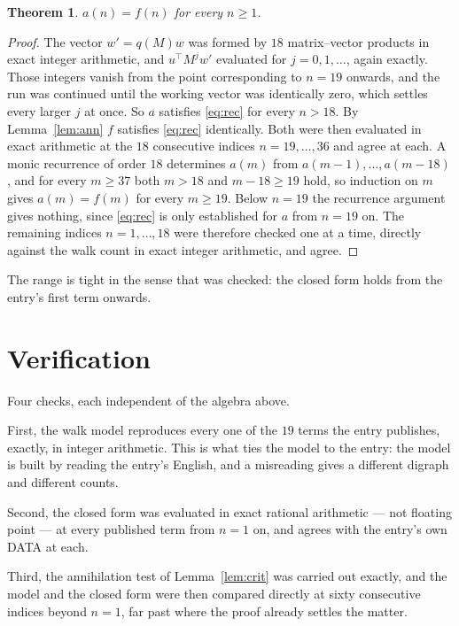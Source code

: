 \documentclass[11pt,a4paper]{article}
\theoremstyle{plain}
\newtheorem{theorem}{Theorem}
\theoremstyle{definition}
\begin{document}
\begin{theorem}
$a(n)=f(n)$ for every $n\ge1$.
\end{theorem}

\begin{proof}
The vector $w'=q(M)w$ was formed by $18$ matrix--vector products in exact integer
arithmetic, and $u^{\!\top}M^{j}w'$ evaluated for $j=0,1,\dots$, again exactly. Those integers
vanish from the point corresponding to $n=19$ onwards, and the run was continued until the
working vector was identically zero, which settles every larger $j$ at once. So $a$ satisfies
\eqref{eq:rec} for every $n>18$. By Lemma~\ref{lem:ann} $f$ satisfies \eqref{eq:rec}
identically. Both were then evaluated in exact arithmetic at the $18$ consecutive indices
$n=19,\dots,36$ and agree at each. A monic recurrence of order $18$
determines $a(m)$ from $a(m-1),\dots,a(m-18)$, and for every $m\ge37$ both
$m>18$ and $m-18\ge19$ hold, so induction on $m$ gives $a(m)=f(m)$ for every
$m\ge19$.
Below $n=19$ the recurrence argument gives nothing, since \eqref{eq:rec} is only
established for $a$ from $n=19$ on. The remaining indices $n=1,\dots,18$ were
therefore checked one at a time, directly against the walk count in exact integer arithmetic,
and agree.
\end{proof}

The range is tight in the sense that was checked: the closed form holds from the entry's first term onwards.

\section{Verification}

Four checks, each independent of the algebra above.

First, the walk model reproduces every one of the $19$ terms the entry publishes,
exactly, in integer arithmetic. This is what ties the model to the entry: the model is built
by reading the entry's English, and a misreading gives a different digraph and different
counts.

Second, the closed form was evaluated in exact rational arithmetic --- not floating point ---
at every published term from $n=1$ on, and agrees with the entry's own DATA at each.

Third, the annihilation test of Lemma~\ref{lem:crit} was carried out exactly, and the model
and the closed form were then compared directly at sixty consecutive indices beyond
$n=1$, far past where the proof already settles the matter.
\end{document}

